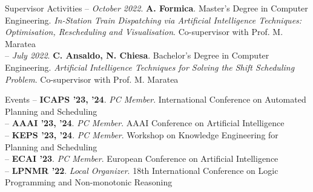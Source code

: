 \documentclass{resume} %
\begin{document}
\begin{rSection}{Supervisor Activities}
-- \textit{October 2022}. \textbf{A. Formica}. Master's Degree in Computer Engineering. \textit{In-Station Train Dispatching via Artificial Intelligence Techniques: Optimisation, Rescheduling and Visualisation}. Co-supervisor with Prof. M. Maratea\\
-- \textit{July 2022}. \textbf{C. Ansaldo, N. Chiesa}. Bachelor's Degree in Computer Engineering. \textit{Artificial Intelligence Techniques for Solving the Shift Scheduling Problem}. Co-supervisor with Prof. M. Maratea
\end{rSection}


\begin{rSection}{Events}
-- \textbf{ICAPS '23, '24}. \textit{PC Member}. International Conference on Automated Planning and Scheduling \\
-- \textbf{AAAI '23, '24}. \textit{PC Member}. AAAI Conference on Artificial Intelligence \\
-- \textbf{KEPS '23, '24}. \textit{PC Member}. Workshop on Knowledge Engineering for Planning and Scheduling \\
-- \textbf{ECAI '23}. \textit{PC Member}. European Conference on Artificial Intelligence \\
-- \textbf{LPNMR '22}. \textit{Local Organizer}. 18th International Conference on Logic Programming and Non-monotonic Reasoning  
\end{rSection}


%
%
%
\end{document}
